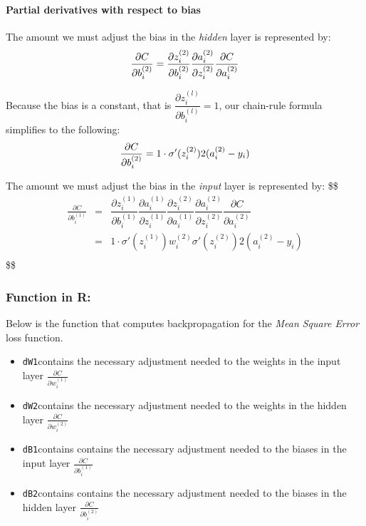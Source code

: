 \documentclass[
]{article}
\providecommand{\tightlist}{%
  \setlength{\itemsep}{0pt}\setlength{\parskip}{0pt}}
\begin{document}
\hypertarget{partial-derivatives-with-respect-to-bias}{%
\paragraph{Partial derivatives with respect to
bias}\label{partial-derivatives-with-respect-to-bias}}

The amount we must adjust the bias in the \emph{hidden} layer is
represented by: \[
\frac{\partial{C}}{\partial{b_i^{(2)}}}  =  \dfrac{\partial{z_i^{(2)}}}{\partial{b_i^{(2)}}}
     \dfrac{\partial{a_i^{(2)}}}{\partial{z_i^{(2)}}}
     \dfrac{\partial{C}}{\partial{a_i^{(2)}}} \\
\]

Because the bias is a constant, that is
\(\dfrac{\partial{z_i^{(l)}}}{\partial{b_i^{(l)}}} = 1\), our chain-rule
formula simplifies to the following: \[
\frac{\partial{C}}{\partial{b_i^{(2)}}} = 1 \cdot \sigma'(z_i^{(2)}) 2(a_i^{(2)}-y_i) \\
\]

The amount we must adjust the bias in the \emph{input} layer is
represented by: \$\$ \begin{eqnarray}
\frac{\partial{C}}{\partial{b_i^{(1)}}}    &=& \dfrac{\partial{z_i^{(1)}}}{\partial{b_i^{(1)}}} \dfrac{\partial{a_i^{(1)}}}{\partial{z_i^{(1)}}}  \dfrac{\partial{z_i^{(2)}}}{\partial{a_i^{(1)}}}
     \dfrac{\partial{a_i^{(2)}}}{\partial{z_i^{(2)}}}
     \dfrac{\partial{C}}{\partial{a_i^{(2)}}} \\
     
&=& 1 \cdot \sigma'(z_i^{(1)}) w_i^{(2)} \sigma'(z_i^{(2)}) 2(a_i^{(2)}-y_i) \\

\end{eqnarray} \$\$

\hypertarget{function-in-r-4}{%
\subsubsection{Function in R:}\label{function-in-r-4}}

Below is the function that computes backpropagation for the \emph{Mean
Square Error} loss function.

\begin{itemize}
\tightlist
\item
  \texttt{dW1}contains the necessary adjustment needed to the weights in
  the input layer \(\frac{\partial{C}}{\partial{w_i^{(1)}}}\)
\item
  \texttt{dW2}contains the necessary adjustment needed to the weights in
  the hidden layer \(\frac{\partial{C}}{\partial{w_i^{(2)}}}\)
\item
  \texttt{dB1}contains contains the necessary adjustment needed to the
  biases in the input layer \(\frac{\partial{C}}{\partial{b_i^{(1)}}}\)
\item
  \texttt{dB2}contains contains the necessary adjustment needed to the
  biases in the hidden layer \(\frac{\partial{C}}{\partial{b_i^{(2)}}}\)
\end{itemize}
\end{document}
